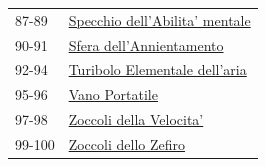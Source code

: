 \begin{multicols}{2}
{{\begin{tabularx}{\linewidth}{ll}
\rowcolor{gray!20}87-89 & \hyperlink{Specchio dell'Abilita' mentale}{Specchio dell'Abilita' mentale}\\
90-91 & \hyperlink{Sfera dell'Annientamento}{Sfera dell'Annientamento}\\
\rowcolor{gray!20}92-94 & \hyperlink{Turibolo Elementale dell'aria}{Turibolo Elementale dell'aria}\\
95-96 & \hyperlink{Vano Portatile}{Vano Portatile}\\
\rowcolor{gray!20}97-98 & \hyperlink{Zoccoli della Velocita'}{Zoccoli della Velocita'}\\
99-100 & \hyperlink{Zoccoli dello Zefiro}{Zoccoli dello Zefiro}
\end{tabularx}}

}

%

\end{multicols}

\pagebreak
